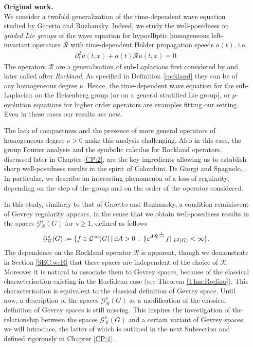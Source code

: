 \documentclass[12pt,oneside,a4paper]{book}
\numberwithin{equation}{section}     %
\theoremstyle{plain}
\theoremstyle{definition}
\begin{document}
\textbf{Original work.}\\
We consider a twofold generalization of the time-dependent wave equation studied by Garetto and Ruzhansky. Indeed, we study the well-posedness on \textit{graded Lie groups} of the wave equation for hypoelliptic homogeneous left-invariant operators $\mathcal{R}$ with time-dependent H\"older propagation speeds $a(t)$, i.e.
\begin{align*}
\partial ^2_{t}u(t,x)+a(t)\mathcal{R} u(t,x)=0.
\end{align*}
The operators $\mathcal{R}$ are a generalisation of sub-Laplacians first considered by \cite{Rockland} and later called after \textit{Rockland}. As specified in Definition \ref{rockland} they can be of any homogeneous degree $\nu$. Hence, the time-dependent wave equation for the sub-Laplacian on the Heisenberg group (or on a general stratified Lie group), or $p$-evolution equations for higher order operators are examples fitting our setting. Even in these cases our results are new.

The lack of compactness and the presence of more general operators of homogeneous degree $\nu>0$ make this analysis challenging. Also in this case, the group Fourier analysis and the symbolic calculus for Rockland operators, discussed later in Chapter \ref{CP:2}, are the key ingredients allowing us to establish sharp well-posedness results in the spirit of Colombini, De Giorgi and Spagnolo, \cite{CDS79}. In particular, we describe an interesting phenomenon of a loss of regularity, depending on the step of the group and on the order of the operator considered.


In this study, similarly to that of Garetto and Ruzhansky, a condition reminiscent of Gevrey regularity appears, in the sense that we obtain well-posedness results in the spaces $\mathcal{G}_{\mathcal{R}}^s(G)$ for $s\geq 1$, defined as follows
\begin{align}\notag
\mathcal G^s_{\mathcal R}(G):=\{f\in\mathcal{C}^\infty(G)\,|\,\exists A>0\,:\,\|e^{A\mathcal R^{\frac{1}{\nu s}}}f\|_{L^2(G)}<\infty\}.
\end{align}
The dependence on the Rockland operator $\mathcal{R}$ is apparent, though we demonstrate in Section \ref{SEC:weR} that these spaces are independent of the choice of $\mathcal{R}$. Moreover it is natural to associate them to Gevrey spaces, because of the classical characterisation existing in the Euclidean case (see Theorem \ref{Thm:Rodino}). This characterisation is equivalent to the classical definition of Gevrey space. Until now, a description of the spaces $\mathcal G^s_{\mathcal R}(G)$ as a modification of the classical definition of Gevrey spaces is still missing. This inspires the investigation of the relationship between the spaces $\mathcal G^s_{\mathcal R}(G)$ and a certain variant of Gevrey spaces we will introduce, the latter of which is outlined in the next Subsection and defined rigorously in Chapter \ref{CP:4}.
\end{document}
